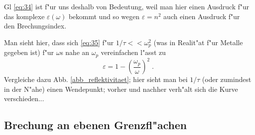 \documentclass[twoside,a4paper]{book}
\newcommand{\I}{\ensuremath{\operatorname{i}}}
\newcommand{\abs}[0]{\bigskip \noindent}
\begin{document}
\abs
Gl \eqref{eq:34} ist f"ur uns deshalb von Bedeutung, weil man hier
einen Ausdruck f"ur das komplexe $\varepsilon(\omega)$ bekommt und so
wegen $\varepsilon = n^2$ auch einen Ausdruck f"ur den
Brechungsindex. 

Man sieht hier, dass sich \eqref{eq:35} f"ur $1/\tau << \omega_p^2$
(was in Realit"at f"ur Metalle gegeben ist) f"ur $\omega$s nahe an
$\omega_p$ vereinfachen l"asst zu
\begin{equation}
\label{eq:38}
\varepsilon = 1 - \left ( \frac{\omega_p}{\omega} \right )^2  \;.
\end{equation}
Vergleiche dazu Abb. \ref{abb_reflektivitaet}; hier sieht man bei
$1/\tau$ (oder zumindest in der N"ahe) einen Wendepunkt; vorher und
nachher verh"alt sich die Kurve verschieden...


















\subsection{Brechung an ebenen Grenzfl"achen}
\label{kap_brechung-an-ebenen-grenzflachen}
\end{document}
